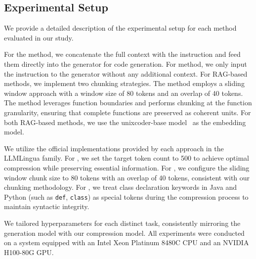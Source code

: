 \subsection{Experimental Setup}

We provide a detailed description of the experimental setup for each method evaluated in our study. 

For the \nocompression method, we concatenate the full context with the instruction and feed them directly into the generator for code generation. For \nocontext method, we only input the instruction to the generator without any additional context. For RAG-based methods, we implement two chunking strategies. The \rag method employs a sliding window approach with a window size of 80 tokens and an overlap of 40 tokens. The \ragfunction method leverages function boundaries and performs chunking at the function granularity, ensuring that complete functions are preserved as coherent units. For both RAG-based methods, we use the unixcoder-base model~\cite{guo2022unixcoder} as the embedding model.

We utilize the official implementations provided by each approach in the LLMLingua family.
For \llmlingua, we set the target token count to 500 to achieve optimal compression while preserving essential information. For \longllmlingua, we configure the sliding window chunk size to 80 tokens with an overlap of 40 tokens, consistent with our chunking methodology. For \llmlinguatwo, we treat class declaration keywords in Java and Python (such as \texttt{def}, \texttt{class}) as special tokens during the compression process to maintain syntactic integrity.

We tailored hyperparameters for each distinct task, consistently mirroring the generation model with our compression model. All experiments were conducted on a system equipped with an Intel Xeon Platinum 8480C CPU and an NVIDIA H100-80G GPU.




